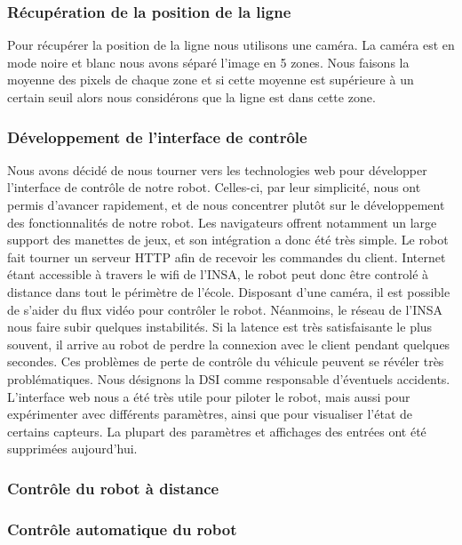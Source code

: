 \subsubsection*{Récupération de la position de la ligne}
Pour récupérer la position de la ligne nous utilisons une caméra. La caméra est en mode noire et blanc nous avons séparé l'image en 5 zones.
Nous faisons la moyenne des pixels de chaque zone et si cette moyenne est supérieure à un certain seuil alors nous considérons que la ligne est dans cette zone.



\subsubsection{Développement de l'interface de contrôle}
Nous avons décidé de nous tourner vers les technologies web pour développer l'interface de contrôle de notre robot. Celles-ci, par leur simplicité, nous ont permis d'avancer rapidement, et de nous concentrer plutôt sur le développement des fonctionnalités de notre robot. Les navigateurs offrent notamment un large support des manettes de jeux, et son intégration a donc été très simple.
Le robot fait tourner un serveur HTTP afin de recevoir les commandes du client. Internet étant accessible à travers le wifi de l'INSA, le robot peut donc être controlé à distance dans tout le périmètre de l'école. Disposant d'une caméra, il est possible de s'aider du flux vidéo pour contrôler le robot.
Néanmoins, le réseau de l'INSA nous faire subir quelques instabilités. Si la latence est très satisfaisante le plus souvent, il arrive au robot de perdre la connexion avec le client pendant quelques secondes. Ces problèmes de perte de contrôle du véhicule peuvent se révéler très problématiques. Nous désignons la DSI comme responsable d'éventuels accidents.
L'interface web nous a été très utile pour piloter le robot, mais aussi pour expérimenter avec différents paramètres, ainsi que pour visualiser l'état de certains capteurs. La plupart des paramètres et affichages des entrées ont été supprimées aujourd'hui.

\subsubsection*{Contrôle du robot à distance}

\todo
\subsubsection*{Contrôle automatique du robot}
\todo